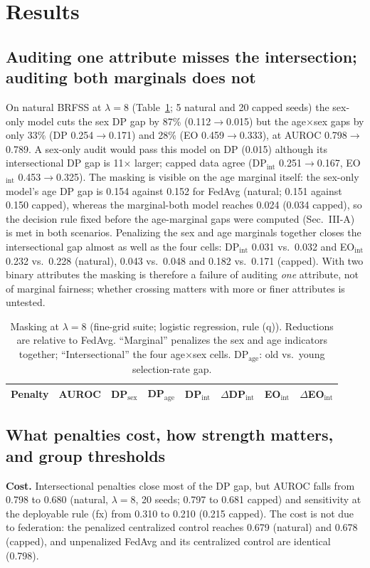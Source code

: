 \section{Results}
\subsection{Auditing one attribute misses the intersection; auditing both marginals does not}
\label{sec:mask}
On natural BRFSS at $\lambda{=}8$ (Table~\ref{tab:mask}; 5 natural and 20 capped seeds) the sex-only model cuts the sex DP gap by 87\% (0.112$\to$0.015) but the age$\times$sex gaps by only 33\% (DP 0.254$\to$0.171) and 28\% (EO 0.459$\to$0.333), at AUROC 0.798$\to$0.789. A sex-only audit would pass this model on DP (0.015) although its intersectional DP gap is 11$\times$ larger; capped data agree (DP$_\text{int}$ 0.251$\to$0.167, EO$_\text{int}$ 0.453$\to$0.325). The masking is visible on the age marginal itself: the sex-only model's age DP gap is 0.154 against 0.152 for FedAvg (natural; 0.151 against 0.150 capped), whereas the marginal-both model reaches 0.024 (0.034 capped), so the decision rule fixed before the age-marginal gaps were computed (Sec.~III-A) is met in both scenarios. Penalizing the sex and age marginals together closes the intersectional gap almost as well as the four cells: DP$_\text{int}$ 0.031 vs.\ 0.032 and EO$_\text{int}$ 0.232 vs.\ 0.228 (natural), 0.043 vs.\ 0.048 and 0.182 vs.\ 0.171 (capped). With two binary attributes the masking is therefore a failure of auditing \emph{one} attribute, not of marginal fairness; whether crossing matters with more or finer attributes is untested.

\begin{table}[t]
\centering
\caption{Masking at $\lambda{=}8$ (fine-grid suite; logistic regression, rule (q)). Reductions are relative to FedAvg. ``Marginal'' penalizes the sex and age indicators together; ``Intersectional'' the four age$\times$sex cells. DP$_\text{age}$: old vs.\ young selection-rate gap.}
\label{tab:mask}
\scriptsize
\setlength{\tabcolsep}{3pt}
\begin{tabular}{lccccccc}
\toprule
Penalty & AUROC & DP$_\text{sex}$ & DP$_\text{age}$ & DP$_\text{int}$ & $\Delta$DP$_\text{int}$ & EO$_\text{int}$ & $\Delta$EO$_\text{int}$\\
\midrule

\bottomrule
\end{tabular}
\end{table}

\subsection{What penalties cost, how strength matters, and group thresholds}
\label{sec:post}
\textbf{Cost.} Intersectional penalties close most of the DP gap, but AUROC falls from 0.798 to 0.680 (natural, $\lambda{=}8$, 20 seeds; 0.797 to 0.681 capped) and sensitivity at the deployable rule (fx) from 0.310 to 0.210 (0.215 capped). The cost is not due to federation: the penalized centralized control reaches 0.679 (natural) and 0.678 (capped), and unpenalized FedAvg and its centralized control are identical (0.798).

